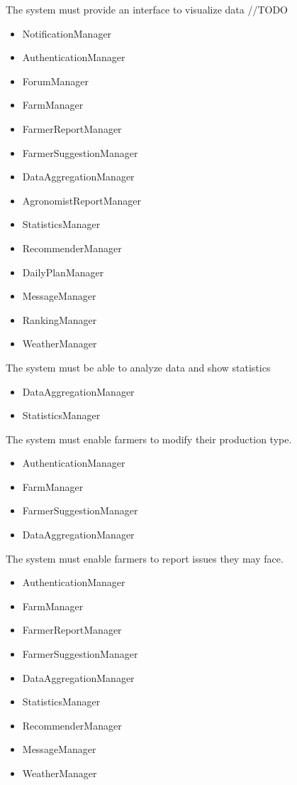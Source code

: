 \begin{itemize}
\begin{itemize}
\end{itemize}
 The system must provide an interface to visualize data //TODO
\begin{itemize}

\item NotificationManager
\item AuthenticationManager
\item ForumManager
\item FarmManager
\item FarmerReportManager
\item FarmerSuggestionManager
\item DataAggregationManager
\item AgronomistReportManager
\item StatisticsManager
\item RecommenderManager
\item DailyPlanManager
\item MessageManager
\item RankingManager
\item WeatherManager

\end{itemize}
 The system must be able to analyze data and show statistics
\begin{itemize}


\item DataAggregationManager
\item StatisticsManager

\end{itemize}
 The system must enable farmers to modify their production type.
\begin{itemize}


\item AuthenticationManager
\item FarmManager
\item FarmerSuggestionManager
\item DataAggregationManager

\end{itemize}


 The system must enable farmers to report issues they may face.
\begin{itemize}

\item AuthenticationManager
\item FarmManager
\item FarmerReportManager
\item FarmerSuggestionManager
\item DataAggregationManager
\item StatisticsManager
\item RecommenderManager
\item MessageManager
\item WeatherManager


\end{itemize}
\end{itemize}
